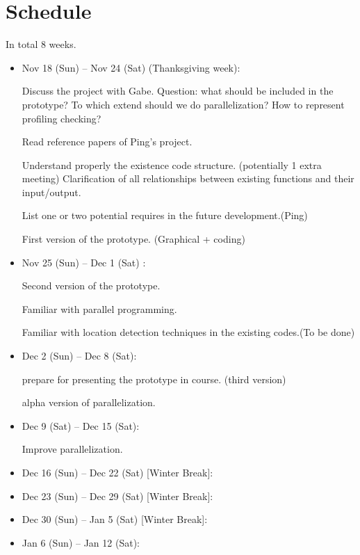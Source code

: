 \documentclass[a4paper,12pt]{article}
\numberwithin{equation}{section}
\begin{document}
	
	
	
	



	\newpage
	\section{Schedule}
	In total 8 weeks.
	
	\begin{itemize}
		\item Nov 18 (Sun) -- Nov 24 (Sat) (Thanksgiving week):  
		
		Discuss the project with Gabe. Question: what should be included in the prototype? To which extend should we do parallelization? How to represent profiling checking?  
		
		Read reference papers of Ping's project.
		
		Understand properly the existence code structure. (potentially 1 extra meeting) 
		Clarification of all relationships between existing functions and their input/output. 
		
		List one or two potential requires in the future development.(Ping)
		
		First version of the prototype. (Graphical + coding)
		
		
		\item Nov 25 (Sun) -- Dec 1 (Sat) : 
		  
		Second version of the prototype. 
		
		Familiar with parallel programming.
		
		Familiar with location detection techniques in the existing codes.(To be done) 
		
		\item Dec 2 (Sun) -- Dec 8 (Sat): 
		
		prepare for presenting the prototype in course. (third version)
		
		alpha version of parallelization.
		
		\item Dec 9 (Sat) -- Dec 15 (Sat):
		
		Improve parallelization. 
		
		\item Dec 16 (Sun) -- Dec 22 (Sat) [Winter Break]:
		\item Dec 23 (Sun) -- Dec 29 (Sat) [Winter Break]:
		\item Dec 30 (Sun) -- Jan 5  (Sat) [Winter Break]:
		\item Jan 6 (Sun) -- Jan 12 (Sat):
		
		
		
		 
		
	\end{itemize}
	


	
	{}
	
\end{document}
